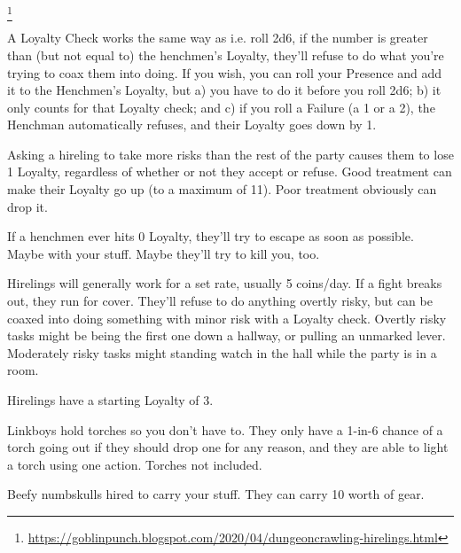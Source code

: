 {\begin{multicols}{2}

    \setcounter{footnote}{0}
    \footnote{\url{https://goblinpunch.blogspot.com/2020/04/dungeoncrawling-hirelings.html}{}}


    A Loyalty Check works the same way as  i.e. roll 2d6, if the number is greater than (but not equal to) the henchmen's Loyalty, they'll refuse to do what you're trying to coax them into doing.  If you wish, you can roll your Presence \UD and add it to the Henchmen's Loyalty, but a) you have to do it before you roll 2d6; b) it only counts for that Loyalty check;  and c) if you roll a Failure (a 1 or a 2), the Henchman automatically refuses, and their Loyalty goes down by 1.

    Asking a hireling to take more risks than the rest of the party causes them to lose 1 Loyalty, regardless of whether or not they accept or refuse. Good treatment can make their Loyalty go up (to a maximum of 11).  Poor treatment obviously can drop it.

    If a henchmen ever hits 0 Loyalty, they'll try to escape as soon as possible.  Maybe with your stuff.  Maybe they'll try to kill you, too.



    Hirelings will generally work for a set rate, usually 5 coins/day.  If a fight breaks out, they run for cover. They'll refuse to do anything overtly risky, but can be coaxed into doing something with minor risk with a Loyalty check.  Overtly risky tasks might be being the first one down a hallway, or pulling an unmarked lever. Moderately risky tasks might standing watch in the hall while the party is in a room.

    Hirelings have a starting Loyalty of 3.


    Linkboys hold torches so you don't have to. They only have a 1-in-6 chance of a torch going out if they should drop one for any reason, and they are able to light a torch using one action.  Torches not included.


    Beefy numbskulls hired to carry your stuff. They can carry 10  worth of gear.


\end{multicols}}
